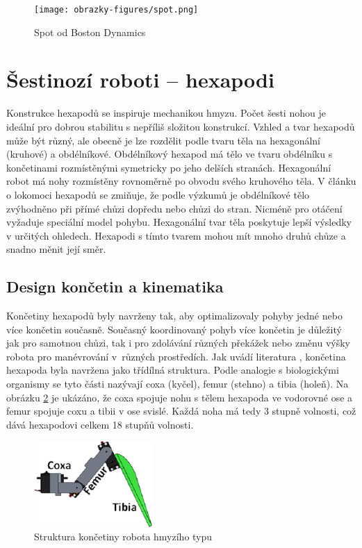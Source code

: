 \begin{figure}[hbt]
	\centering
	\texttt{[image: obrazky-figures/spot.png]}
	\caption[spot]{Spot od Boston Dynamics\footnotemark}
	\label{quadSpot}
\end{figure}


\section{Šestinozí roboti -- hexapodi}
Konstrukce hexapodů se inspiruje mechanikou hmyzu. Počet šesti nohou je ideální pro dobrou stabilitu s nepříliš složitou konstrukcí. Vzhled a tvar hexapodů může být různý, ale obecně je lze rozdělit podle tvaru těla na hexagonální (kruhové) a obdélníkové. Obdélníkový hexapod má tělo ve tvaru obdélníku s končetinami rozmístěnými symetricky po jeho delších stranách. Hexagonální robot má nohy rozmístěny rovnoměrně po obvodu svého kruhového těla. V článku o lokomoci hexapodů \cite{HexapodSymetric} se zmiňuje, že podle výzkumů je obdélníkové tělo zvýhodněno při přímé chůzi dopředu nebo chůzi do stran. Nicméně pro otáčení vyžaduje speciální model pohybu. Hexagonální tvar těla poskytuje lepší výsledky v určitých ohledech. Hexapodi s tímto tvarem mohou mít mnoho druhů chůze a snadno měnit její směr.

\subsection*{Design končetin a kinematika}
Končetiny hexapodů byly navrženy tak, aby optimalizovaly pohyby jedné nebo více končetin současně. Současný koordinovaný pohyb více končetin je důležitý jak pro samotnou chůzi, tak i pro zdolávání různých překážek nebo změnu výšky robota pro manévrování v~různých prostředích. Jak uvádí literatura \cite{HexapodDesign}, končetina hexapoda byla navržena jako třídílná struktura. Podle analogie s biologickými organismy se tyto části nazývají coxa (kyčel), femur (stehno) a tibia (holeň). Na obrázku \ref{hexleg} je ukázáno, že coxa spojuje nohu s tělem hexapoda ve vodorovné ose a femur spojuje coxu a tibii v ose svislé. Každá noha má tedy 3 stupně volnosti, což dává hexapodovi celkem 18 stupňů volnosti.

\begin{figure}[hbt]
	\centering
	\includegraphics[width=0.4\textwidth]{obrazky-figures/hexleg.png}
	\caption{Struktura končetiny robota hmyzího typu \cite{HexapodDesign}}
	\label{hexleg}
\end{figure}

